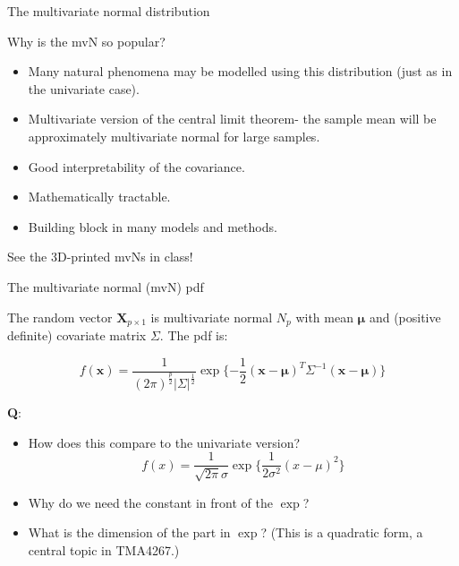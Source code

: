 \documentclass[ignorenonframetext,]{beamer}
\providecommand{\tightlist}{%
  \setlength{\itemsep}{0pt}\setlength{\parskip}{0pt}}
\begin{document}
\begin{frame}{The multivariate normal distribution}

Why is the mvN so popular?

\begin{itemize}
\tightlist
\item
  Many natural phenomena may be modelled using this distribution (just
  as in the univariate case).
\item
  Multivariate version of the central limit theorem- the sample mean
  will be approximately multivariate normal for large samples.
\item
  Good interpretability of the covariance.
\item
  Mathematically tractable.
\item
  Building block in many models and methods.
\end{itemize}

\end{frame}

\begin{frame}

See the 3D-printed mvNs in class!

\end{frame}

\begin{frame}

\begin{block}{The multivariate normal (mvN) pdf}

The random vector \(\mathbf{X}_{p\times 1}\) is multivariate normal
\(N_p\) with mean \(\mathbf{\mu}\) and (positive definite) covariate
matrix \(\Sigma\). The pdf is:

\[f(\mathbf{x})=\frac{1}{(2\pi)^\frac{p}{2}|\Sigma|^\frac{1}{2}} \exp\{-\frac{1}{2}(\mathbf{x}-\mathbf{\mu})^T\Sigma^{-1}(\mathbf{x}-\mathbf{\mu})\}\]

\textbf{Q}:

\begin{itemize}
\item
  How does this compare to the univariate version?
  \[f(x)=\frac{1}{\sqrt{2\pi}\sigma}\exp\{ \frac{1}{2\sigma^2}(x-\mu)^2\}\]
\item
  Why do we need the constant in front of the \(\exp\)?
\item
  What is the dimension of the part in \(\exp\)? (This is a quadratic
  form, a central topic in TMA4267.)
\end{itemize}

\end{block}

\end{frame}
\end{document}
